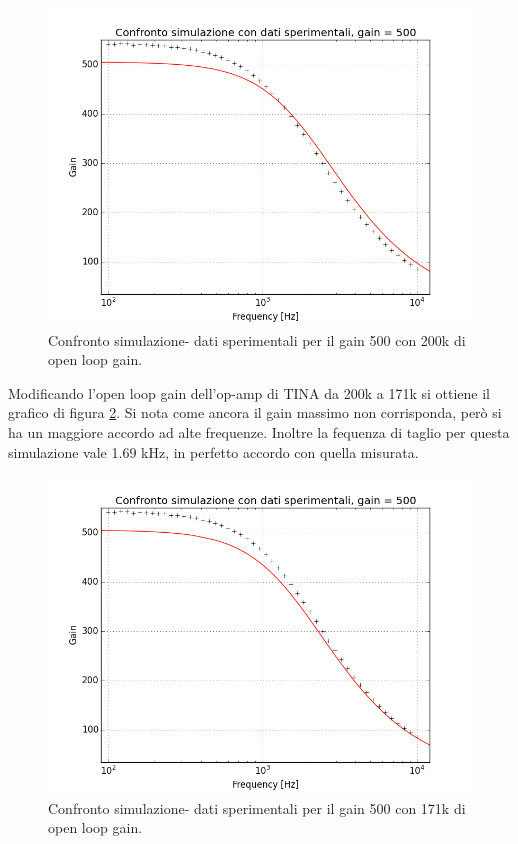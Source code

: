 \documentclass[journal, a4paper]{IEEEtran}
\begin{document}
\begin{figure}[htp]
\includegraphics[scale=.4]{hm4comparisons_nonsim}
\caption{Confronto simulazione- dati sperimentali per il gain 500 con 200k di open loop gain.}
\label{fig:gain500nonsim}
\end{figure}

Modificando l'open loop gain dell'op-amp di TINA da 200k a 171k si ottiene il grafico di figura \ref{fig:gain500sim}. Si nota come ancora il gain massimo non corrisponda, però si ha un maggiore accordo ad alte frequenze. Inoltre la fequenza di taglio per questa simulazione vale 1.69 kHz, in perfetto accordo con quella misurata.

\begin{figure}[htp]
\includegraphics[scale=.4]{hm4comparisons_sim}
\caption{Confronto simulazione- dati sperimentali per il gain 500 con 171k di open loop gain.}
\label{fig:gain500sim}
\end{figure}
\end{document}
